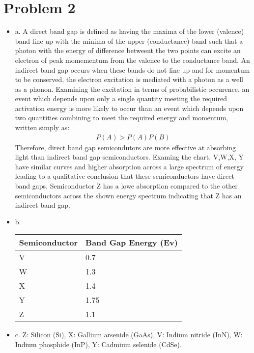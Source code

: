 \documentclass{article}
\numberwithin{equation}{section}
\begin{document}
\section*{Problem 2}
\begin{itemize}
\item a. A direct band gap is defined as having the maxima of the lower (valence) band line up with the minima of the upper (conductance) band such that a photon with the energy of difference betweent the two points can excite an electron of peak momementum from the valence to the conductance band. An indirect band gap occurs when these bands do not line up and for momentum to be conserved, the electron excitation is mediated with a photon as a well as a phonon. Examining the excitation in terms of probabilistic occurence, an event which depends upon only a single quantity meeting the required activation energy is more likely to occur than an event which depends upon two quantities combining to meet the required energy and momentum, written simply as:
\begin{align*}
	P(A)>P(A)P(B)
\end{align*}
Therefore, direct band gap semicondutors are more effective at absorbing light than indirect band gap semiconductors. Examing the chart, V,W,X, Y have similar curves and higher absorption across a large spectrum of energy leading to a qualitative conclusion that these semiconductors have direct band gaps. Semiconductor Z has a lowe absorption compared to the other semiconductors across the shown energy spectrum indicating that Z has an indirect band gap.
\item b. 
\begin{table}[t]
\begin{center}
\begin{tabular}{|l |l |} 
  \hline
 Semiconductor & Band Gap Energy (Ev) \\
  \hline
  V & 0.7 \\ \hline
  W & 1.3\\ \hline
  X & 1.4\\ \hline
  Y & 1.75\\ \hline
  Z & 1.1\\ \hline
\end{tabular}
\end{center}
\end{table}

\item c. Z: Silicon (Si), X: Gallium arsenide (GaAs), V: Indium nitride (InN), W: Indium phosphide (InP), Y: Cadmium selenide (CdSe).
\end{itemize}
\end{document}
